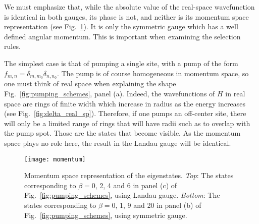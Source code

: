 \documentclass[twocolumn, 10pt, aps, superscriptaddress, floatfix, showpacs, pra, citeautoscript]{revtex4-1}
\newcommand{\co}[2]{#2}
\renewcommand{\paragraph}{\co}
\begin{document}
We must emphasize that, while the absolute value of the real-space
wavefunction is identical in both gauges, its phase is not, and
neither is its momentum space representation (see
Fig.~\ref{fig:hom_mom_sp}). It is only the symmetric gauge which has a
well defined angular momentum. This is important when examining the
selection rules.

\paragraph{A δ pump in real space is homogeneous in momentum space.}

The simplest case is that of pumping a single site, with a pump of the
form $f_{m,n} = \delta_{m,m_0} \delta_{n,n_0}$. The pump is of course
homogeneous in momentum space, so one must think of real space when
explaining the shape Fig.~\ref{fig:pumping_schemes}, panel (a).
Indeed, the wavefunctions of $H$ in real space are rings of finite
width which increase in radius as the energy increases (see
Fig.~\ref{fig:delta_real_sp}). Therefore, if one pumps an off-center
site, there will only be a limited range of rings that will have radii
such as to overlap with the pump spot. Those are the states that
become visible. As the momentum space plays no role here, the result
in the Landau gauge will be identical.
%
\begin{figure}[htb]\centering
  \texttt{[image: momentum]} %
  \caption{Momentum space representation of the
    eigenstates. \emph{Top}: The states corresponding to $\beta=0$, 2,
    4 and 6 in panel (c) of Fig.~\ref{fig:pumping_schemes}, using
    Landau gauge.  \emph{Bottom}: The states corresponding to
    $\beta=0$, 1, 9 and 20 in panel (b) of
    Fig.~\ref{fig:pumping_schemes}, using symmetric gauge.}
  \label{fig:hom_mom_sp}
\end{figure}

\end{document}
